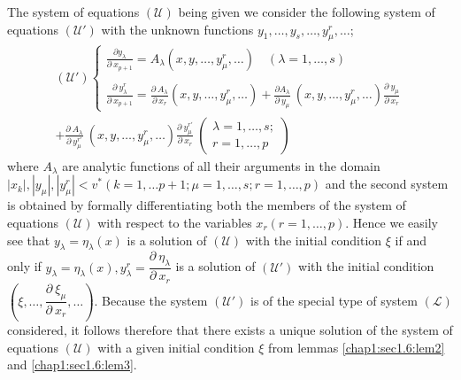 \begin{proof of theorem}%
  The system of equations $(\mathscr{U})$ being given we consider the
  following system of equations $(\mathscr{U}')$ with the unknown
  functions $y_1,  \ldots,  y_s,  \ldots,  y^r_\mu,  \ldots$;  
  \begin{multline*}
  (\mathscr{U}') 
  \begin{cases}
    \frac{\partial y_\lambda}{\partial ~x_{p+1}} = A_\lambda (x, y,
    \ldots,  y^r_\mu,  \ldots)  \quad (\lambda =1,  \ldots,  s)\\ 
          {}\\
          \frac{\partial ~ y^r_\lambda}{\partial ~ x_{p+1}} =
          \frac{\partial ~ A_\lambda}{\partial ~ x_r} (x, y,  \ldots,
          y^r_\mu,  \ldots) + \frac{\partial A_\lambda}{ \partial ~ y_\mu} ~
          (x, y,  \ldots,  y^r_\mu,  \ldots) \frac{\partial ~ y_\mu}{
            \partial ~ x_r} 
  \end{cases}\\
  + \frac{ \partial ~ A_\lambda}{ \partial ~ y^{r'}_\mu} ~ (x, y,
  \ldots,  y^r_\mu,  \ldots ) \frac{\partial ~ y^{r'}_\mu}{\partial ~
    x_r} ~ \begin{pmatrix}  \lambda = 1,  \ldots ,  s; \\ r =1,
    \ldots,  p\end{pmatrix} 
  \end{multline*}
    where $A_\lambda$ are analytic functions of all their arguments in the
    domain $| x_k |,  | y_\mu | ,  | y^r_\mu | < v^* (k =1,  \ldots p+1;
    \mu = 1,  \ldots,  s; r=1,  \ldots,  p) $ and  the second system is
    obtained by formally differentiating both the members of the system of
    equations $(\mathscr{U})$ with respect to the variables $ x_r (r=1,
    \ldots,  p)$. Hence we easily see that $y_\lambda = \eta_\lambda (x)$\pageoriginale
    is a solution of $(\mathscr{U})$ with the initial condition $\xi$ if
    and only if $y_\lambda = \eta_\lambda (x),  y^r_\lambda =
    \dfrac{\partial ~ \eta_\lambda}{\partial ~ x_r}$ is a solution of
    $(\mathscr{U}')$ with the initial condition $\left(\xi,  \ldots,
    \dfrac{\partial ~ \xi_\mu}{\partial ~ x_r},  \ldots\right)$. Because the
    system $(\mathscr{U}')$ is of the special type of system
    $(\mathscr{L})$ considered,  it follows therefore that there exists a
    unique solution of the system of equations $(\mathscr{U})$ with a
    given initial condition $\xi$ from lemmas \ref{chap1:sec1.6:lem2}
    and \ref{chap1:sec1.6:lem3}.  
\end{proof of theorem}

